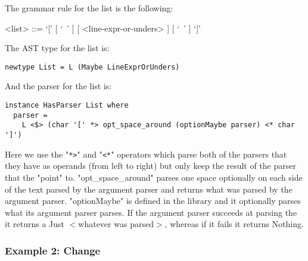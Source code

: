 \documentclass{article}
\begin{document}
The grammar rule for the list is the following:
\begin{grammar}
<list> ::= `[' [ `\ ' ] [ <line-expr-or-unders> ] [ `\ ' ] `]' \\
\end{grammar}
The AST type for the list is:
\begin{verbatim}
newtype List = L (Maybe LineExprOrUnders)

\end{verbatim}
And the parser for the list is:
\begin{verbatim}
instance HasParser List where
  parser =
    L <$> (char '[' *> opt_space_around (optionMaybe parser) <* char ']')

\end{verbatim}
Here we use the "\texttt{*>}" and "\texttt{<*}" operators which parse both of
the parsers that they have as operands (from left to right) but only keep the
result of the parser that the "point" to. "opt_space_around" parses one space
optionally on each side of the text parsed by the argument parser and returns
what was parsed by the argument parser.  "optionMaybe" is defined in the
library and it optionally parses what its argument parser parses. If the
argument parser succeeds at parsing the it returns a Just $<$whatever was
parsed$>$, whereas if it fails it returns Nothing.

\subsubsection{Example 2: Change}
\end{document}
